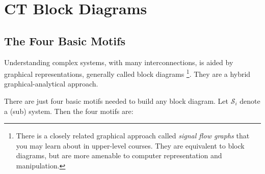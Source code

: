 \section{CT Block Diagrams}

\subsection{The Four Basic Motifs}

Understanding complex systems, with many interconnections, is aided by graphical representations, generally called block diagrams \footnote{There is a closely related graphical approach called \emph{signal flow graphs} that you may learn about in upper-level courses. They are equivalent to block diagrams, but are more amenable to computer representation and manipulation.}. They are a hybrid graphical-analytical approach.

There are just four basic motifs needed to build any block diagram. Let $\mathcal{S}_i$ denote a (sub) system. Then the four motifs are:

